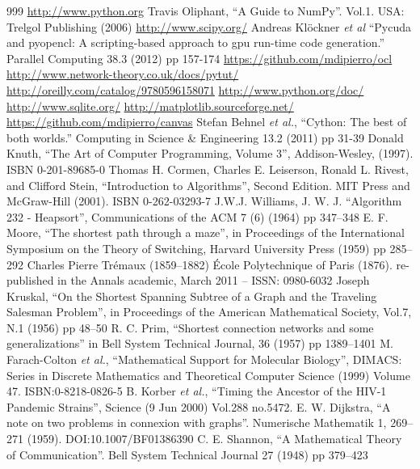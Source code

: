 \documentclass[justified, sixbynine]{tufte-book}
\theoremstyle{plain}%
\newtheorem * {corollary}{Corollary}
\theoremstyle{definition}
\theoremstyle{remark}
\newtheorem * {remark}{Remark}
\newtheorem * {note}{Note}
\begin{document}
\begin{thebibliography}{999}
 \url{http://www.python.org}
 Travis Oliphant, ``A Guide to NumPy''. Vol.1. USA: Trelgol Publishing (2006)
 \url{http://www.scipy.org/}
 Andreas Klöckner {\it et al} ``Pycuda and pyopencl: A scripting-based approach to gpu run-time code generation.'' Parallel Computing 38.3 (2012) pp 157-174
 \url{https://github.com/mdipierro/ocl}
 \url{http://www.network-theory.co.uk/docs/pytut/}
 \url{http://oreilly.com/catalog/9780596158071}
 \url{http://www.python.org/doc/}
 \url{http://www.sqlite.org/}
 \url{http://matplotlib.sourceforge.net/}
 \url{https://github.com/mdipierro/canvas}
 Stefan Behnel {\it et al.}, ``Cython: The best of both worlds.'' Computing in Science \& Engineering 13.2 (2011) pp 31-39
 Donald Knuth, ``The Art of Computer Programming, Volume 3'', Addison-Wesley, (1997). ISBN 0-201-89685-0
 Thomas H. Cormen, Charles E. Leiserson, Ronald L. Rivest, and Clifford Stein, ``Introduction to Algorithms'', Second Edition. MIT Press and McGraw-Hill (2001). ISBN 0-262-03293-7
 J.W.J. Williams, J. W. J. ``Algorithm 232 - Heapsort'', Communications of the ACM 7 (6) (1964) pp 347–348
 E. F. Moore, ``The shortest path through a maze'', in Proceedings of the International Symposium on the Theory of Switching, Harvard University Press (1959) pp 285–292
 Charles Pierre Trémaux (1859–1882) École Polytechnique of Paris (1876). re-published in the Annals academic, March 2011 – ISSN: 0980-6032
 Joseph Kruskal, ``On the Shortest Spanning Subtree of a Graph and the Traveling Salesman Problem'', in Proceedings of the American Mathematical Society, Vol.7, N.1 (1956) pp 48–50
 R. C. Prim, ``Shortest connection networks and some generalizations'' in Bell System Technical Journal, 36 (1957) pp 1389–1401
 M. Farach-Colton {\it et al.}, ``Mathematical Support for Molecular Biology'', DIMACS: Series in Discrete Mathematics and Theoretical Computer Science (1999) Volume 47. ISBN:0-8218-0826-5
 B. Korber {\it et al.}, ``Timing the Ancestor of the HIV-1 Pandemic Strains'', Science (9 Jun 2000) Vol.288 no.5472.
 E. W. Dijkstra, ``A note on two problems in connexion with graphs''. Numerische Mathematik 1, 269–271 (1959). DOI:10.1007/BF01386390
 C. E. Shannon, ``A Mathematical Theory of Communication''. Bell System Technical Journal 27 (1948) pp 379–423

\end{thebibliography}
\end{document}
